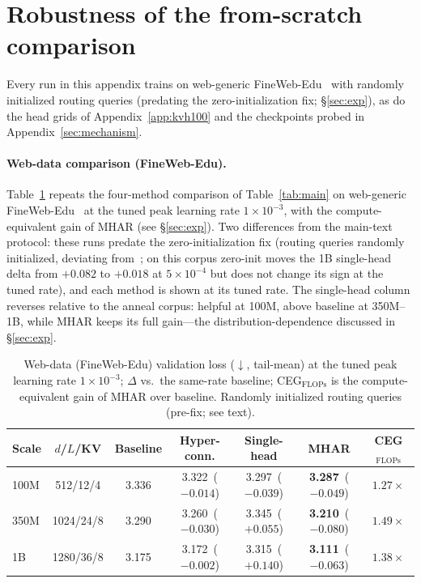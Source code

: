 \documentclass{article}
\begin{document}
\section{Robustness of the from-scratch comparison}
\label{app:robustness}
Every run in this appendix trains on web-generic
FineWeb-Edu~\citep{penedo2024fineweb} with randomly initialized routing
queries (predating the zero-initialization fix; \S\ref{sec:exp}), as do the
head grids of Appendix~\ref{app:kvh100} and the checkpoints probed in
Appendix~\ref{sec:mechanism}.

\paragraph{Web-data comparison (FineWeb-Edu).} Table~\ref{tab:mainweb} repeats
the four-method comparison of Table~\ref{tab:main} on web-generic
FineWeb-Edu~\citep{penedo2024fineweb} at the tuned peak learning rate
$1\times10^{-3}$, with the compute-equivalent gain of MHAR (see
\S\ref{sec:exp}). Two differences from the main-text protocol: these runs
predate the zero-initialization fix (routing queries randomly initialized,
deviating from~\citet{kimi2025attention}; on this corpus zero-init moves the 1B
single-head delta from $+0.082$ to $+0.018$ at $5\times10^{-4}$ but does not
change its sign at the tuned rate), and each method is shown at its tuned rate.
The single-head column reverses relative to the anneal corpus: helpful at 100M,
above baseline at 350M--1B, while MHAR keeps its full gain---the
distribution-dependence discussed in \S\ref{sec:exp}.

\begin{table}[h]
\centering
\caption{Web-data (FineWeb-Edu) validation loss ($\downarrow$, tail-mean) at the
tuned peak learning rate $1\times10^{-3}$; $\Delta$ vs.\ the same-rate baseline;
CEG$_{\mathrm{FLOPs}}$ is the compute-equivalent gain of MHAR over baseline.
Randomly initialized routing queries (pre-fix; see text).}
\label{tab:mainweb}
\begin{tabular}{lcccccc}
\toprule
\textbf{Scale} & \textbf{$d$/$L$/KV} & \textbf{Baseline} & \textbf{Hyper-conn.} & \textbf{Single-head} & \textbf{MHAR} & \textbf{CEG$_{\mathrm{FLOPs}}$} \\
\midrule
100M & 512/12/4  & 3.336 & 3.322 \,($-0.014$) & 3.297 \,($-0.039$) & \textbf{3.287} \,($-0.049$) & $1.27\times$ \\
350M & 1024/24/8 & 3.290 & 3.260 \,($-0.030$) & 3.345 \,($+0.055$) & \textbf{3.210} \,($-0.080$) & $1.49\times$ \\
1B   & 1280/36/8 & 3.175 & 3.172 \,($-0.002$) & 3.315 \,($+0.140$) & \textbf{3.111} \,($-0.063$) & $1.38\times$ \\
\bottomrule
\end{tabular}
\end{table}
\end{document}
